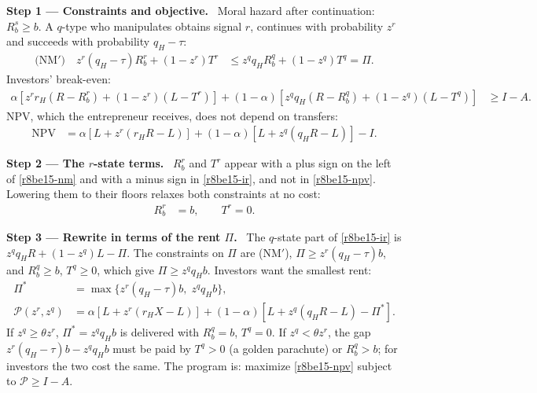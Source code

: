 \documentclass[11pt,a4paper]{article}
\newcommand{\step}[2]{\par\medskip\noindent\textbf{Step #1 --- #2.}~}
\begin{document}
\step{1}{Constraints and objective} Moral hazard after continuation: $R_b^s\ge b$. A $q$-type who manipulates obtains signal $r$, continues with probability $z^r$ and succeeds with probability $q_H-\tau$:
\begin{align}
  \text{(NM$'$)}\quad z^r(q_H-\tau)R_b^r + (1-z^r)T^r &\le z^qq_HR_b^q + (1-z^q)T^q = \Pi. \label{r8be15-nm}
\end{align}
Investors' break-even:
\begin{align}
  \alpha[z^rr_H(R-R_b^r)+(1-z^r)(L-T^r)] + (1-\alpha)[z^qq_H(R-R_b^q)+(1-z^q)(L-T^q)] &\ge I-A. \label{r8be15-ir}
\end{align}
NPV, which the entrepreneur receives, does not depend on transfers:
\begin{align}
  \mathrm{NPV} &= \alpha[L+z^r(r_HR-L)] + (1-\alpha)[L+z^q(q_HR-L)] - I. \label{r8be15-npv}
\end{align}

\step{2}{The $r$-state terms} $R_b^r$ and $T^r$ appear with a plus sign on the left of \eqref{r8be15-nm} and with a minus sign in \eqref{r8be15-ir}, and not in \eqref{r8be15-npv}. Lowering them to their floors relaxes both constraints at no cost:
\begin{align}
  R_b^r &= b, \qquad T^r = 0. \label{r8be15-r}
\end{align}

\step{3}{Rewrite in terms of the rent $\Pi$} The $q$-state part of \eqref{r8be15-ir} is $z^qq_HR+(1-z^q)L-\Pi$. The constraints on $\Pi$ are (NM$'$), $\Pi\ge z^r(q_H-\tau)b$, and $R_b^q\ge b$, $T^q\ge0$, which give $\Pi\ge z^qq_Hb$. Investors want the smallest rent:
\begin{align}
  \Pi^* &= \max\{z^r(q_H-\tau)b,\; z^qq_Hb\}, \label{r8be15-pi}\\
  \mathcal P(z^r,z^q) &= \alpha[L+z^r(r_HX-L)] + (1-\alpha)[L+z^q(q_HR-L)-\Pi^*]. \label{r8be15-P}
\end{align}
If $z^q\ge\theta z^r$, $\Pi^*=z^qq_Hb$ is delivered with $R_b^q=b$, $T^q=0$. If $z^q<\theta z^r$, the gap $z^r(q_H-\tau)b-z^qq_Hb$ must be paid by $T^q>0$ (a golden parachute) or $R_b^q>b$; for investors the two cost the same. The program is: maximize \eqref{r8be15-npv} subject to $\mathcal P\ge I-A$.
\end{document}
